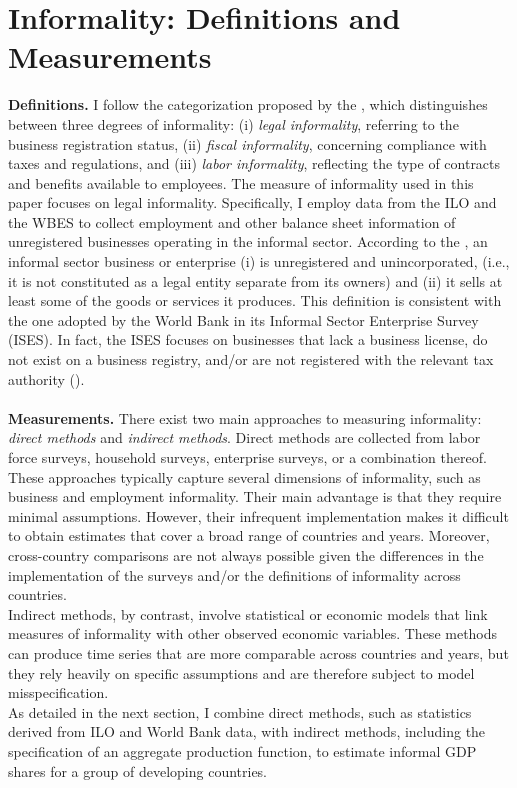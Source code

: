 \documentclass[letterpaper, 12pt]{article}
\begin{document}
\section{Informality: Definitions and Measurements}\label{sec_def}
\textbf{Definitions.}
I follow the categorization proposed by the \textcolor{blue}{\textcite{worldbank2020}}, which distinguishes between three degrees of informality: (i) \textit{legal informality}, referring to the business registration status, (ii) \textit{fiscal informality}, concerning compliance with taxes and regulations, and (iii) \textit{labor informality}, reflecting the type of contracts and benefits available to employees. The measure of informality used in this paper focuses on legal informality. Specifically, I employ data from the ILO and the WBES to collect employment and other balance sheet information of unregistered businesses operating in the informal sector. According to the \textcolor{blue}{\textcite{ilo}}, an informal sector business or enterprise  
(i) is unregistered and unincorporated, (i.e., it is not constituted as a legal entity separate from its owners) and (ii) it sells at least some of the goods or services it produces. This definition is consistent with the one adopted by the World Bank in its Informal Sector Enterprise Survey (ISES). In fact, the ISES focuses on businesses that lack a business license, do not exist on a business registry, and/or are not registered with the relevant tax authority (\textcolor{blue}{\textcite{agaetal2022}}).
\\
\\\textbf{Measurements.}
There exist two main approaches to measuring informality: \textit{direct methods} and \textit{indirect methods}.
Direct methods are collected from labor force surveys, household surveys, enterprise surveys, or a combination thereof. These approaches typically capture several dimensions of informality, such as business and employment informality.  
Their main advantage is that they require minimal assumptions. However, their infrequent implementation makes it difficult to obtain estimates that cover a broad range of countries and years. Moreover, cross-country comparisons are not always possible given the differences in the implementation of the surveys and/or the definitions of informality across countries. 
\\Indirect methods, by contrast, involve statistical or economic models that link measures of informality with other observed economic variables. These methods can produce time series that are more comparable across countries and years, but they rely heavily on specific assumptions and are therefore subject to model misspecification.  
\\As detailed in the next section, I combine direct methods, such as statistics derived from ILO and World Bank data, with indirect  methods, including the specification of an aggregate production function, to estimate informal GDP shares for a group of developing countries.
\end{document}
